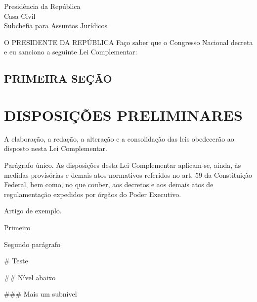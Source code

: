 \documentclass[a4paper,capitulo,12pt]{br-lex}
\begin{document}
\begin{center}
    Presidência da República\\
    Casa Civil\\
    Subchefia para Assuntos Jurídicos   
\end{center}



O PRESIDENTE DA REPÚBLICA Faço saber que o Congresso  Nacional decreta
e eu sanciono a seguinte Lei Complementar:

\section{PRIMEIRA SEÇÃO}

\chapter{DISPOSIÇÕES PRELIMINARES}
\label{chap:disposicoes}

\artigo A elaboração, a redação, a alteração e a consolidação das leis
obedecerão ao disposto nesta Lei Complementar.

Parágrafo único. As disposições desta Lei Complementar aplicam-se, ainda, às medidas provisórias e demais atos normativos referidos no art. 59 da Constituição Federal, bem como, no que couber, aos decretos e aos demais atos de regulamentação expedidos por órgãos do Poder Executivo.

\artigo {}

\artigo Artigo de exemplo.

\begin{paragrafos}

\paragrafo Primeiro

\paragrafo Segundo parágrafo

\end{paragrafos}

\begin{easylist}

# Teste

## Nível abaixo

### Mais um subnível

\end{easylist}
\end{document}
